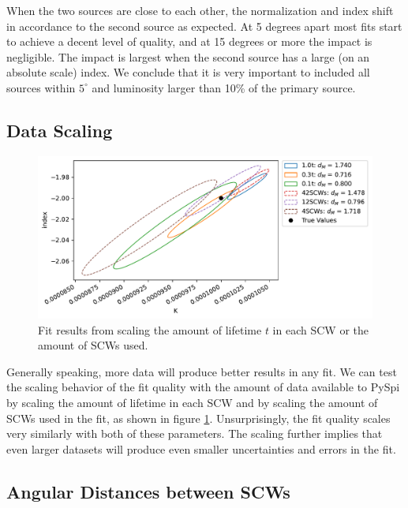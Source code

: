 \documentclass{report}
\begin{document}
When the two sources are close to each other, the normalization and index shift in accordance to the second source as expected. At 5 degrees apart most fits start to achieve a decent level of quality, and at 15 degrees or more the impact is negligible. The impact is largest when the second source has a large (on an absolute scale) index. We conclude that it is very important to included all sources within $5^\circ$ and luminosity larger than 10\% of the primary source.


\subsection{Data Scaling}

\begin{figure}[h]
  \centering
  \includegraphics[width=\textwidth]{Images/Pure_Simulation/combined_plot_data_scaling.pdf}
  \caption{Fit results from scaling the amount of lifetime $t$ in each SCW or the amount of SCWs used.}
  \label{fig data scaling}
\end{figure}

Generally speaking, more data will produce better results in any fit. We can test the scaling behavior of the fit quality with the amount of data available to PySpi by scaling the amount of lifetime in each SCW and by scaling the amount of SCWs used in the fit, as shown in figure \ref{fig data scaling}. Unsurprisingly, the fit quality scales very similarly with both of these parameters. The scaling further implies that even larger datasets will produce even smaller uncertainties and errors in the fit. 


\subsection{Angular Distances between SCWs}
\end{document}
